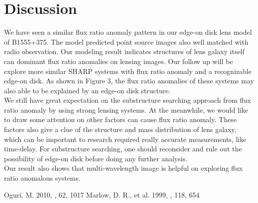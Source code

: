 \documentclass[manuscript]{emulateapj}
\begin{document}
\section{Discussion}
We have seen a similar flux ratio anomaly pattern in our edge-on disk lens model of B1555+375. The model predicted point source images also well matched with radio observation. Our modeling result indicates structures of lens galaxy itself can dominant flux ratio anomalies on lensing images. 
Our follow up will be explore more similar SHARP systems with flux ratio anomaly and a recognizable edge-on disk. As shown in Figure 3, the flux ratio anomalies of these systems may also able to be explained by an edge-on disk structure.\\
We still have great expectation on the substructure searching approach from flux ratio anomaly by using strong lensing systems. At the meanwhile, we would like to draw some attention on other factors can cause flux ratio anomaly. These factors also give a clue of the structure and mass distribution of lens galaxy, which can be important to research required really accurate measurements, like time-delay.  For substructure searching, one should reconsider and rule out the possibility of edge-on disk before doing any further analysis.\\
Our result also shows that multi-wavelength image is helpful on exploring flux ratio anomalous systems.

\begin{thebibliography}{}
 Oguri, M. 2010, \pasj, 62, 1017
 Marlow, D. R., et al. 1999, \apj, 118, 654
\end{thebibliography}
\end{document}
